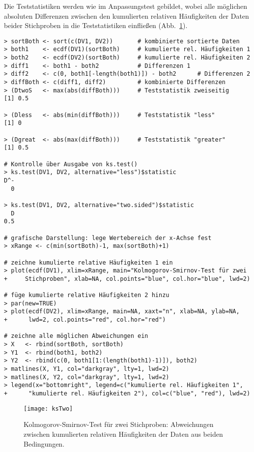 Die Teststatistiken werden wie im Anpassungstest gebildet, wobei alle möglichen absoluten Differenzen zwischen den kumulierten relativen Häufigkeiten der Daten beider Stichproben in die Teststatistiken einfließen (Abb.\ \ref{fig:ksTwo}).
\begin{lstlisting}
> sortBoth <- sort(c(DV1, DV2))       # kombinierte sortierte Daten
> both1    <- ecdf(DV1)(sortBoth)     # kumulierte rel. Häufigkeiten 1
> both2    <- ecdf(DV2)(sortBoth)     # kumulierte rel. Häufigkeiten 2
> diff1    <- both1 - both2           # Differenzen 1
> diff2    <- c(0, both1[-length(both1)]) - both2      # Differenzen 2
> diffBoth <- c(diff1, diff2)         # kombinierte Differenzen
> (DtwoS   <- max(abs(diffBoth)))     # Teststatistik zweiseitig
[1] 0.5

> (Dless   <- abs(min(diffBoth)))     # Teststatistik "less"
[1] 0

> (Dgreat  <- abs(max(diffBoth)))     # Teststatistik "greater"
[1] 0.5

# Kontrolle über Ausgabe von ks.test()
> ks.test(DV1, DV2, alternative="less")$statistic
D^-
  0

> ks.test(DV1, DV2, alternative="two.sided")$statistic
  D
0.5

# grafische Darstellung: lege Wertebereich der x-Achse fest
> xRange <- c(min(sortBoth)-1, max(sortBoth)+1)

# zeichne kumulierte relative Häufigkeiten 1 ein
> plot(ecdf(DV1), xlim=xRange, main="Kolmogorov-Smirnov-Test für zwei
+     Stichproben", xlab=NA, col.points="blue", col.hor="blue", lwd=2)

# füge kumulierte relative Häufigkeiten 2 hinzu
> par(new=TRUE)
> plot(ecdf(DV2), xlim=xRange, main=NA, xaxt="n", xlab=NA, ylab=NA,
+      lwd=2, col.points="red", col.hor="red")

# zeichne alle möglichen Abweichungen ein
> X   <- rbind(sortBoth, sortBoth)
> Y1  <- rbind(both1, both2)
> Y2  <- rbind(c(0, both1[1:(length(both1)-1)]), both2)
> matlines(X, Y1, col="darkgray", lty=1, lwd=2)
> matlines(X, Y2, col="darkgray", lty=1, lwd=2)
> legend(x="bottomright", legend=c("kumulierte rel. Häufigkeiten 1",
+      "kumulierte rel. Häufigkeiten 2"), col=c("blue", "red"), lwd=2)
\end{lstlisting}

\begin{figure}[ht]
\centering
\texttt{[image: ksTwo]}
\vspace*{-1.5em}
\caption{Kolmogorov-Smirnov-Test für zwei Stichproben: Abweichungen zwischen kumulierten relativen Häufigkeiten der Daten aus beiden Bedingungen.}
\label{fig:ksTwo}
\end{figure}

